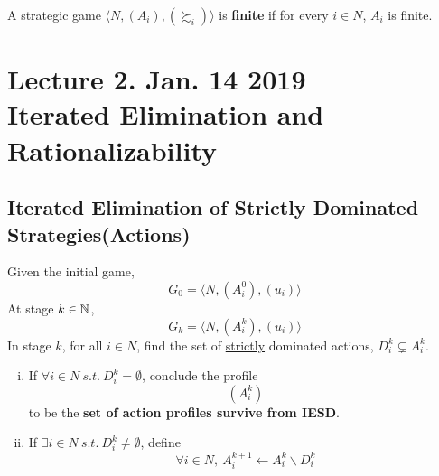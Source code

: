 \documentclass[11pt]{article}
\begin{document}
		\begin{definition}
			A strategic game $\langle N, (A_i), (\succsim_i) \rangle$ is \textbf{finite} if for every $i \in N$, $A_i$ is finite.
		\end{definition}
	
	\section{Lecture 2. Jan. 14 2019\\Iterated Elimination and Rationalizability}
		
		\subsection{Iterated Elimination of Strictly Dominated Strategies(Actions)}
			\begin{definition}[IESD]
				Given the initial game,
				\[
					G_0 = \langle N, (A^0_i), (u_i) \rangle
				\] 
				At stage $k \in \mathbb{N}$, 
				\[
					G_k = \langle N, (A^k_i), (u_i) \rangle
				\]
				In stage $k$, for all $i \in N$, find the set of \ul{strictly} dominated actions, $D_i^k \subsetneq A_i^k$.
				\begin{enumerate}[i)]
					\item If $\forall i \in N\ s.t.\ D_i^k = \emptyset$, conclude the profile
					\[
						(A_i^k)
					\]
					to be the \textbf{set of action profiles survive from IESD}.
					\item If $\exists i \in N\ s.t.\ D_i^k \neq \emptyset$, define
					\[
						\forall i \in N,\ A^{k+1}_i \leftarrow A^k_i \backslash D_i^k
					\]
				\end{enumerate}
			\end{definition}
			
\end{document}
